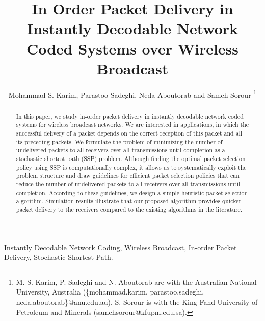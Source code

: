 \documentclass[12pt, peerreview, onecolumn]{IEEEtran}
\begin{document}
\title{In Order Packet Delivery  in Instantly Decodable Network Coded Systems over Wireless Broadcast}
\vspace{-7mm}
\author{Mohammad S. Karim,  Parastoo Sadeghi, Neda Aboutorab  and Sameh Sorour
\thanks{M. S. Karim, P. Sadeghi and N. Aboutorab  are with the  Australian National University, Australia (\{mohammad.karim,
parastoo.sadeghi, neda.aboutorab\}@anu.edu.au). S. Sorour is with the King Fahd University of Petroleum and Minerals (samehsorour@kfupm.edu.sa).}






}

\maketitle


\maketitle
\vspace{-7mm}
\begin{abstract}
In this paper, we study  in-order packet delivery in instantly decodable network coded systems for wireless broadcast networks. We are  interested in applications, in which  the successful delivery of a packet  depends on the correct reception of this packet and    all its preceding packets. We  formulate the  problem of minimizing the number of undelivered packets to all receivers over all transmissions until completion  as a stochastic shortest path (SSP) problem. Although finding the optimal packet selection policy using SSP is computationally complex, it allows  us to systematically exploit the problem structure and draw guidelines for efficient packet selection policies that can  reduce the number of undelivered packets to all receivers over all transmissions until completion. According to these guidelines, we design a simple heuristic packet selection algorithm. Simulation results illustrate that our proposed  algorithm  provides quicker packet  delivery  to the receivers   compared to the existing algorithms in the literature.
\end{abstract}





\vspace{-5mm}
\begin{IEEEkeywords}
Instantly Decodable Network Coding, Wireless Broadcast, In-order Packet Delivery, Stochastic Shortest Path.
\end{IEEEkeywords}
\vspace{-7mm}
\end{document}
